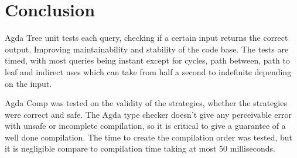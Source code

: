 \section{Conclusion}

Agda Tree unit tests each query, checking if a certain input returns the
correct output. Improving maintainability and stability of the code base. The
tests are timed, with most queries being instant except for cycles, path
between, path to leaf and indirect uses which can take from half a second to
indefinite depending on the input.  

Agda Comp was tested on the validity of the strategies, whether the strategies
were correct and safe. The Agda type checker doesn't give any perceivable error
with unsafe or incomplete compilation, so it is critical to give a guarantee of
a well done compilation. The time to create the compilation order was tested,
but it is negligible compare to compilation time taking at most 50
milliseconds.

%

